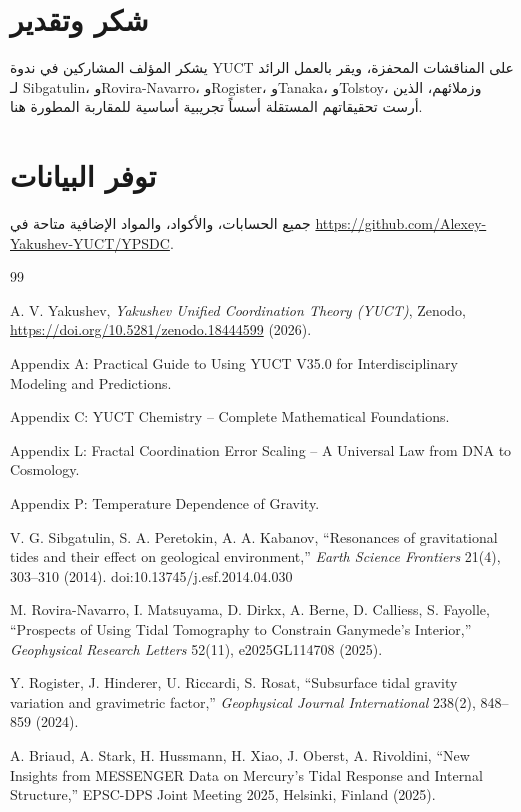 \documentclass[12pt,a4paper]{article}
\theoremstyle{remark}
\begin{document}
	\section*{شكر وتقدير}
	
	يشكر المؤلف المشاركين في ندوة YUCT على المناقشات المحفزة، ويقر بالعمل الرائد لـ Sibgatulin، وRovira-Navarro، وRogister، وTanaka، وTolstoy، وزملائهم، الذين أرست تحقيقاتهم المستقلة أسساً تجريبية أساسية للمقاربة المطورة هنا.
	
	\section*{توفر البيانات}
	
	جميع الحسابات، والأكواد، والمواد الإضافية متاحة في \url{https://github.com/Alexey-Yakushev-YUCT/YPSDC}.
	
	\begin{thebibliography}{99}
		
		A. V. Yakushev, \emph{Yakushev Unified Coordination Theory (YUCT)}, Zenodo, \url{https://doi.org/10.5281/zenodo.18444599} (2026).
		
		Appendix A: Practical Guide to Using YUCT V35.0 for Interdisciplinary Modeling and Predictions.
		
		Appendix C: YUCT Chemistry -- Complete Mathematical Foundations.
		
		Appendix L: Fractal Coordination Error Scaling -- A Universal Law from DNA to Cosmology.
		
		Appendix P: Temperature Dependence of Gravity.
		
		V. G. Sibgatulin, S. A. Peretokin, A. A. Kabanov, ``Resonances of gravitational tides and their effect on geological environment,'' \emph{Earth Science Frontiers} 21(4), 303–310 (2014). doi:10.13745/j.esf.2014.04.030
		
		M. Rovira-Navarro, I. Matsuyama, D. Dirkx, A. Berne, D. Calliess, S. Fayolle, ``Prospects of Using Tidal Tomography to Constrain Ganymede's Interior,'' \emph{Geophysical Research Letters} 52(11), e2025GL114708 (2025).
		
		Y. Rogister, J. Hinderer, U. Riccardi, S. Rosat, ``Subsurface tidal gravity variation and gravimetric factor,'' \emph{Geophysical Journal International} 238(2), 848–859 (2024).
		
		A. Briaud, A. Stark, H. Hussmann, H. Xiao, J. Oberst, A. Rivoldini, ``New Insights from MESSENGER Data on Mercury's Tidal Response and Internal Structure,'' EPSC-DPS Joint Meeting 2025, Helsinki, Finland (2025).
		

\end{thebibliography}
\end{document}
